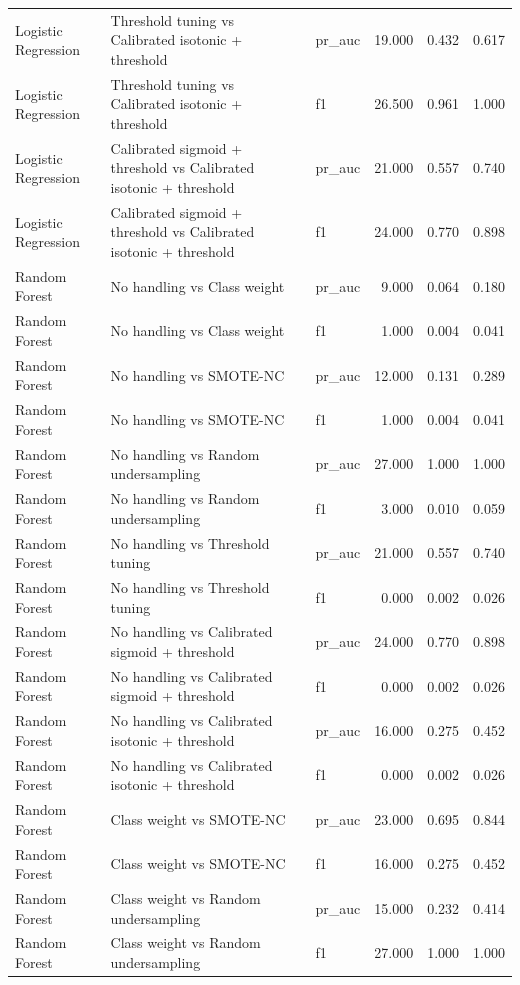 \begin{tabular}{lllrrr}
Logistic Regression & Threshold tuning vs Calibrated isotonic + threshold & pr_auc & 19.000 & 0.432 & 0.617 \\
Logistic Regression & Threshold tuning vs Calibrated isotonic + threshold & f1 & 26.500 & 0.961 & 1.000 \\
Logistic Regression & Calibrated sigmoid + threshold vs Calibrated isotonic + threshold & pr_auc & 21.000 & 0.557 & 0.740 \\
Logistic Regression & Calibrated sigmoid + threshold vs Calibrated isotonic + threshold & f1 & 24.000 & 0.770 & 0.898 \\
Random Forest & No handling vs Class weight & pr_auc & 9.000 & 0.064 & 0.180 \\
Random Forest & No handling vs Class weight & f1 & 1.000 & 0.004 & 0.041 \\
Random Forest & No handling vs SMOTE-NC & pr_auc & 12.000 & 0.131 & 0.289 \\
Random Forest & No handling vs SMOTE-NC & f1 & 1.000 & 0.004 & 0.041 \\
Random Forest & No handling vs Random undersampling & pr_auc & 27.000 & 1.000 & 1.000 \\
Random Forest & No handling vs Random undersampling & f1 & 3.000 & 0.010 & 0.059 \\
Random Forest & No handling vs Threshold tuning & pr_auc & 21.000 & 0.557 & 0.740 \\
Random Forest & No handling vs Threshold tuning & f1 & 0.000 & 0.002 & 0.026 \\
Random Forest & No handling vs Calibrated sigmoid + threshold & pr_auc & 24.000 & 0.770 & 0.898 \\
Random Forest & No handling vs Calibrated sigmoid + threshold & f1 & 0.000 & 0.002 & 0.026 \\
Random Forest & No handling vs Calibrated isotonic + threshold & pr_auc & 16.000 & 0.275 & 0.452 \\
Random Forest & No handling vs Calibrated isotonic + threshold & f1 & 0.000 & 0.002 & 0.026 \\
Random Forest & Class weight vs SMOTE-NC & pr_auc & 23.000 & 0.695 & 0.844 \\
Random Forest & Class weight vs SMOTE-NC & f1 & 16.000 & 0.275 & 0.452 \\
Random Forest & Class weight vs Random undersampling & pr_auc & 15.000 & 0.232 & 0.414 \\
Random Forest & Class weight vs Random undersampling & f1 & 27.000 & 1.000 & 1.000 \\

\end{tabular}
